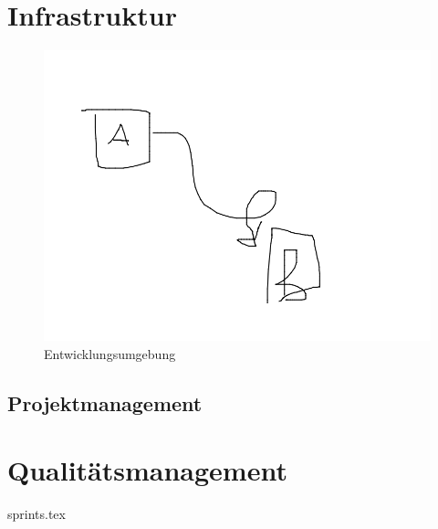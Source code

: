 \chapter{Infrastruktur}

\xxx


\begin{figure}[H]
	\centering
	\includegraphics[width=\linewidth]{fig/entwicklungsumgebung}
	\caption{Entwicklungsumgebung}
	\label{fig:pm:entwicklungsumgebung}
\end{figure}

\section{Projektmanagement}

\chapter{Qualitätsmanagement}

\xxx

{sprints.tex}
